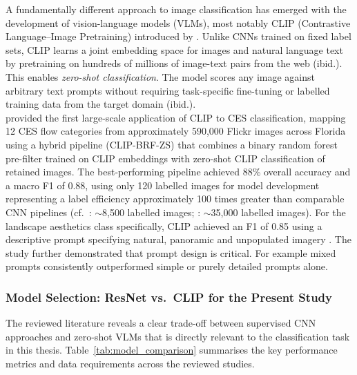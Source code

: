 \documentclass[hidelinks, 11pt]{article}
\begin{document}
A fundamentally different approach to image classification has emerged with the development of vision-language models (VLMs), most notably CLIP (Contrastive Language--Image Pretraining) introduced by \citet{radford_learning_2021}. Unlike CNNs trained on fixed label sets, CLIP learns a joint embedding space for images and natural language text by pretraining on hundreds of millions of image-text pairs from the web (ibid.). This enables \textit{zero-shot classification}. The model scores any image against arbitrary text prompts without requiring task-specific fine-tuning or labelled training data from the target domain (ibid.).
\\
\citet{liao_mapping_2025} provided the first large-scale application of CLIP to CES classification, mapping 12 CES flow categories from approximately 590{,}000 Flickr images across Florida using a hybrid pipeline (CLIP-BRF-ZS) that combines a binary random forest pre-filter trained on CLIP embeddings with zero-shot CLIP classification of retained images. The best-performing pipeline achieved 88\% overall accuracy and a macro F1 of 0.88, using only 120 labelled images for model development representing a label efficiency approximately 100 times greater than comparable CNN pipelines (cf.\ \citealt{cardoso_classifying_2022}: $\sim$8{,}500 labelled images; \citealt{lingua_valuing_2022}: $\sim$35{,}000 labelled images). For the landscape aesthetics class specifically, CLIP achieved an F1 of 0.85 using a descriptive prompt specifying natural, panoramic and unpopulated imagery \citet{liao_mapping_2025}. The study further demonstrated that prompt design is critical. For example mixed prompts consistently outperformed simple or purely detailed prompts alone.

\subsubsection{Model Selection: ResNet vs.\ CLIP for the Present Study}

The reviewed literature reveals a clear trade-off between supervised CNN approaches and zero-shot VLMs that is directly relevant to the classification task in this thesis. Table~\ref{tab:model_comparison} summarises the key performance metrics and data requirements across the reviewed studies.
\end{document}
